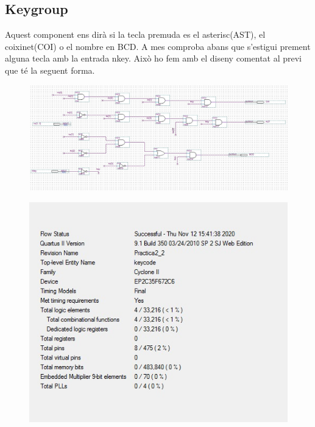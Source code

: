 \documentclass[12pt, a4papre]{article}
\begin{document}
	\subsection{Keygroup}
	
	Aquest component ens dirà si la tecla premuda es el asterisc(AST), el coixinet(COI) o el nombre en BCD. A mes comproba abans que s'estigui prement alguna tecla amb la entrada nkey. Això ho fem amb el diseny comentat al previ que té la seguent forma.
	
	\begin{figure}[H]
		\begin{center}
		\includegraphics[width=130mm]{Keycode.jpeg}
		\end{center}
	\end{figure}
	\begin{figure}[H]
		\begin{center}
		\includegraphics[width=130mm]{informekeygroup.jpeg}
		\end{center}
	\end{figure}
	
\end{document}
